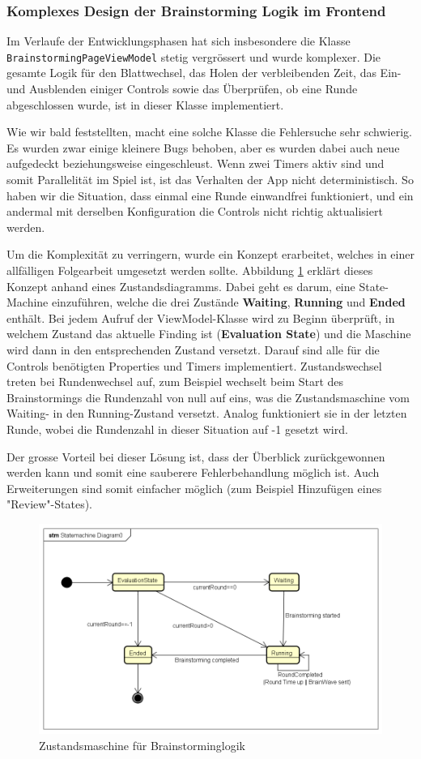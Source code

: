 \subsubsection{Komplexes Design der Brainstorming Logik im Frontend}\label{subsub:design-issue}
Im Verlaufe der Entwicklungsphasen hat sich insbesondere die Klasse \texttt{Brain\-storming\-PageViewModel} stetig vergrössert und wurde komplexer. Die gesamte Logik für den Blattwechsel, das Holen der verbleibenden Zeit, das Ein- und Ausblenden einiger Controls sowie das Überprüfen, ob eine Runde abgeschlossen wurde, ist in dieser Klasse implementiert. 

Wie wir bald feststellten, macht eine solche Klasse die Fehlersuche sehr schwierig. Es wurden zwar einige kleinere Bugs behoben, aber es wurden dabei auch neue aufgedeckt beziehungsweise eingeschleust. Wenn zwei Timers aktiv sind und somit Parallelität im Spiel ist, ist das Verhalten der App nicht deterministisch. So haben wir die Situation, dass einmal eine Runde einwandfrei funktioniert, und ein andermal mit derselben Konfiguration die Controls nicht richtig aktualisiert werden. 

Um die Komplexität zu verringern, wurde ein Konzept erarbeitet, welches in einer allfälligen Folgearbeit umgesetzt werden sollte. Abbildung \ref{fig:statemachine-brainstorming} erklärt dieses Konzept anhand eines Zustandsdiagramms. Dabei geht es darum, eine State-Machine einzuführen, welche die drei Zustände \textbf{Waiting}, \textbf{Running} und \textbf{Ended} enthält. Bei jedem Aufruf der ViewModel-Klasse wird zu Beginn überprüft, in welchem Zustand das aktuelle Finding ist (\textbf{Evaluation State}) und die Maschine wird dann in den entsprechenden Zustand versetzt. Darauf sind alle für die Controls benötigten Properties und Timers implementiert. Zustandswechsel treten bei Rundenwechsel auf, zum Beispiel wechselt beim Start des Brainstormings die Rundenzahl von null auf eins, was die Zustandsmaschine vom Waiting- in den Running-Zustand versetzt. Analog funktioniert sie in der letzten Runde, wobei die Rundenzahl in dieser Situation auf -1 gesetzt wird. 

Der grosse Vorteil bei dieser Lösung ist, dass der Überblick zurückgewonnen werden kann und somit eine sauberere Fehlerbehandlung möglich ist. Auch Erweiterungen sind somit einfacher möglich (zum Beispiel Hinzufügen eines "Review"-States). 
\begin{figure}
	\centering
	\includegraphics[width=0.7\linewidth]{img/techn-bericht/statemachine-brainstorming}
	\caption{Zustandsmaschine für Brainstorminglogik}
	\label{fig:statemachine-brainstorming}
\end{figure}

